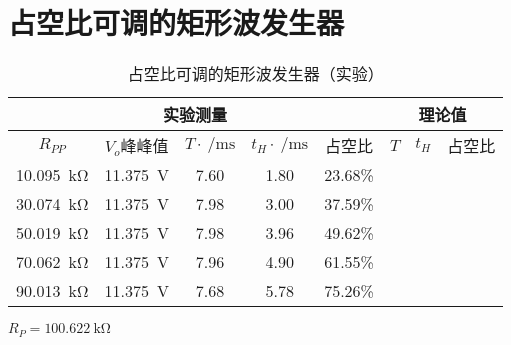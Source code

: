 \documentclass[UTF8]{ctexart}
\numberwithin{figure}{subsection}
\numberwithin{table}{subsection}
\numberwithin{equation}{subsection}
\begin{document}
\section{占空比可调的矩形波发生器}
\begin{table}[h]
    \begin{center}
        \caption{占空比可调的矩形波发生器（实验）}
        \begin{tabular}{|c|c|c|c|c|c|c|c|}
            \hline
            \multicolumn{5}{|c|}{实验测量} & \multicolumn{3}{c|}{理论值} \\
            \hline
            \(R_{PP}\) & \(V_o\)峰峰值 & \(T\cdot\SI{}{\per\milli\second}\) & \(t_H\cdot\SI{}{\per\milli\second}\) & 占空比 & \(T\) & \(t_H\) & 占空比 \\
            \hline
            \SI{10.095}{\kilo\ohm} & \SI{11.375}{\volt} & 7.60 & 1.80 & 23.68\% & & & \\
            \hline
            \SI{30.074}{\kilo\ohm} & \SI{11.375}{\volt} & 7.98 & 3.00 & 37.59\% & & & \\
            \hline
            \SI{50.019}{\kilo\ohm} & \SI{11.375}{\volt} & 7.98 & 3.96 & 49.62\% & & & \\
            \hline
            \SI{70.062}{\kilo\ohm} & \SI{11.375}{\volt} & 7.96 & 4.90 & 61.55\% & & & \\
            \hline
            \SI{90.013}{\kilo\ohm} & \SI{11.375}{\volt} & 7.68 & 5.78 & 75.26\% & & & \\
            \hline
        \end{tabular}
        \par \(R_P = \SI{100.622}{\kilo\ohm}\)
    \end{center}
    \label{PWM exp data}
\end{table}
\end{document}
